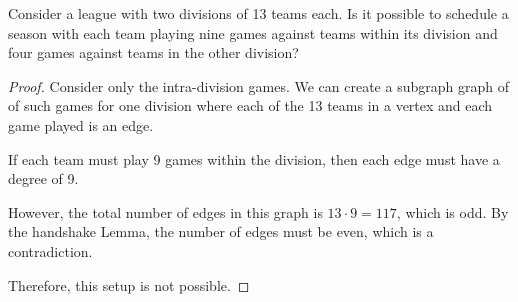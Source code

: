 \documentclass[../hw4]{subfiles}
\begin{document}
\begin{problem}
Consider a league with two divisions of 13 teams each.
Is it possible to schedule a season with each team playing nine games against teams within its division and four games against teams in the other division?
\end{problem}
\begin{proof}
	Consider only the intra-division games.
	We can create a subgraph graph of of such games for one division where each of the 13 teams in a vertex and each game played is an edge.

	If each team must play 9 games within the division, then each edge must have a degree of 9.

	However, the total number of edges in this graph is $13\cdot 9=117$, which is odd.
	By the handshake Lemma, the number of edges must be even, which is a contradiction.

	Therefore, this setup is not possible.
\end{proof}
\end{document}
